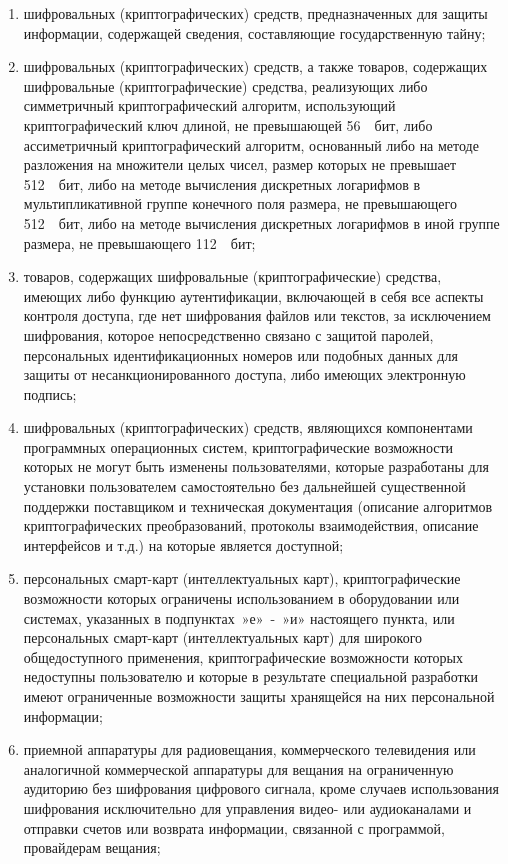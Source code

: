 \begin{enumerate}
\item шифровальных (криптографических) средств, предназначенных для защиты информации, содержащей сведения, составляющие государственную тайну;
\item шифровальных (криптографических) средств, а также товаров, содержащих шифровальные (криптографические) средства, реализующих либо симметричный криптографический алгоритм, использующий криптографический ключ длиной, не превышающей 56  бит, либо ассиметричный криптографический алгоритм, основанный либо на методе разложения на множители целых чисел, размер которых не превышает 512  бит, либо на методе вычисления дискретных логарифмов в мультипликативной группе конечного поля размера, не превышающего 512  бит, либо на методе вычисления дискретных логарифмов в иной группе размера, не превышающего 112  бит;
\item товаров, содержащих шифровальные (криптографические) средства, имеющих либо функцию аутентификации, включающей в себя все аспекты контроля доступа, где нет шифрования файлов или текстов, за исключением шифрования, которое непосредственно связано с защитой паролей, персональных идентификационных номеров или подобных данных для защиты от несанкционированного доступа, либо имеющих электронную подпись;
\item шифровальных (криптографических) средств, являющихся компонентами программных операционных систем, криптографические возможности которых не могут быть изменены пользователями, которые разработаны для установки пользователем самостоятельно без дальнейшей существенной поддержки поставщиком и техническая документация (описание алгоритмов криптографических преобразований, протоколы взаимодействия, описание интерфейсов и т.д.) на которые является доступной;
\item персональных смарт-карт (интеллектуальных карт), криптографические возможности которых ограничены использованием в оборудовании или системах, указанных в подпунктах »е» - »и» настоящего пункта, или персональных смарт-карт (интеллектуальных карт) для широкого общедоступного применения, криптографические возможности которых недоступны пользователю и которые в результате специальной разработки имеют ограниченные возможности защиты хранящейся на них персональной информации;
\item приемной аппаратуры для радиовещания, коммерческого телевидения или аналогичной коммерческой аппаратуры для вещания на ограниченную аудиторию без шифрования цифрового сигнала, кроме случаев использования шифрования исключительно для управления видео- или аудиоканалами и отправки счетов или возврата информации, связанной с программой, провайдерам вещания;

\end{enumerate}
